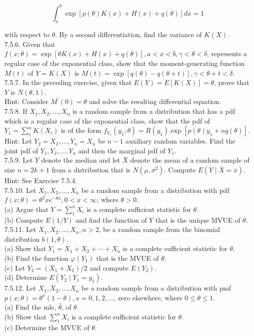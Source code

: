 $$
\int_{a}^{b} \exp [p(\theta) K(x)+H(x)+q(\theta)] d x=1
$$

with respect to $\theta$. By a second differentiation, find the variance of $K(X)$.\\
7.5.6. Given that $f(x ; \theta)=\exp [\theta K(x)+H(x)+q(\theta)], a<x<b, \gamma<\theta<\delta$, represents a regular case of the exponential class, show that the moment-generating function $M(t)$ of $Y=K(X)$ is $M(t)=\exp [q(\theta)-q(\theta+t)], \gamma<\theta+t<\delta$.\\
7.5.7. In the preceding exercise, given that $E(Y)=E[K(X)]=\theta$, prove that $Y$ is $N(\theta, 1)$.\\
Hint: Consider $M^{\prime}(0)=\theta$ and solve the resulting differential equation.\\
7.5.8. If $X_{1}, X_{2}, \ldots, X_{n}$ is a random sample from a distribution that has a pdf which is a regular case of the exponential class, show that the pdf of $Y_{1}=\sum_{1}^{n} K\left(X_{i}\right)$ is of the form $f_{Y_{1}}\left(y_{1} ; \theta\right)=R\left(y_{1}\right) \exp \left[p(\theta) y_{1}+n q(\theta)\right]$.\\
Hint: Let $Y_{2}=X_{2}, \ldots, Y_{n}=X_{n}$ be $n-1$ auxiliary random variables. Find the joint pdf of $Y_{1}, Y_{2}, \ldots, Y_{n}$ and then the marginal pdf of $Y_{1}$.\\
7.5.9. Let $Y$ denote the median and let $\bar{X}$ denote the mean of a random sample of size $n=2 k+1$ from a distribution that is $N\left(\mu, \sigma^{2}\right)$. Compute $E(Y \mid \bar{X}=\bar{x})$.\\
Hint: See Exercise 7.5.4.\\
7.5.10. Let $X_{1}, X_{2}, \ldots, X_{n}$ be a random sample from a distribution with pdf $f(x ; \theta)=\theta^{2} x e^{-\theta x}, 0<x<\infty$, where $\theta>0$.\\
(a) Argue that $Y=\sum_{1}^{n} X_{i}$ is a complete sufficient statistic for $\theta$.\\
(b) Compute $E(1 / Y)$ and find the function of $Y$ that is the unique MVUE of $\theta$.\\
7.5.11. Let $X_{1}, X_{2}, \ldots, X_{n}, n>2$, be a random sample from the binomial distribution $b(1, \theta)$.\\
(a) Show that $Y_{1}=X_{1}+X_{2}+\cdots+X_{n}$ is a complete sufficient statistic for $\theta$.\\
(b) Find the function $\varphi\left(Y_{1}\right)$ that is the MVUE of $\theta$.\\
(c) Let $Y_{2}=\left(X_{1}+X_{2}\right) / 2$ and compute $E\left(Y_{2}\right)$.\\
(d) Determine $E\left(Y_{2} \mid Y_{1}=y_{1}\right)$.\\
7.5.12. Let $X_{1}, X_{2}, \ldots, X_{n}$ be a random sample from a distribution with pmf $p(x ; \theta)=\theta^{x}(1-\theta), x=0,1,2, \ldots$, zero elsewhere, where $0 \leq \theta \leq 1$.\\
(a) Find the mle, $\hat{\theta}$, of $\theta$.\\
(b) Show that $\sum_{1}^{n} X_{i}$ is a complete sufficient statistic for $\theta$.\\
(c) Determine the MVUE of $\theta$.

